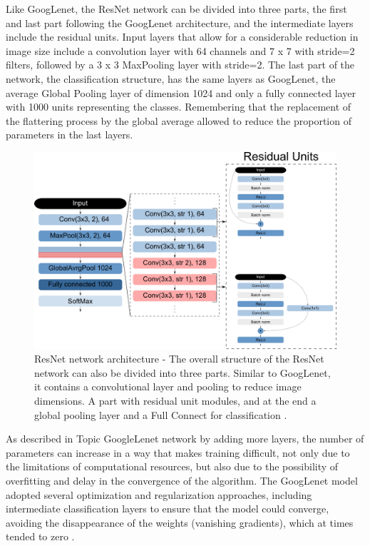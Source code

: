 Like GoogLenet, the ResNet network can be divided into three parts, the first and last part following the GoogLenet architecture, and the intermediate layers include the residual units. Input layers that allow for a considerable reduction in image size include a convolution layer with 64 channels and 7 x 7 with stride=2 filters, followed by a 3 x 3 MaxPooling layer with stride=2. The last part of the network, the classification structure, has the same layers as GoogLenet, the average Global Pooling layer of dimension 1024 and only a fully connected layer with 1000 units representing the classes. Remembering that the replacement of the flattering process by the global average allowed to reduce the proportion of parameters in the last layers.

\begin{figure}
    \centering
    \includegraphics[scale=0.4]{"Part 3 - Learning Systems/Supervised Learning/Deep Learning/images/figure135.png"}
    \caption{ResNet network architecture - The overall structure of the ResNet network can also be divided into three parts. Similar to GoogLenet, it contains a convolutional layer and pooling to reduce image dimensions. A part with residual unit modules, and at the end a global pooling layer and a Full Connect for classification \cite{geron2019}.}
    \label{fig:figure135}
\end{figure}

As described in Topic GoogleLenet network by adding more layers, the number of parameters can increase in a way that makes training difficult, not only due to the limitations of computational resources, but also due to the possibility of overfitting and delay in the convergence of the algorithm. The GoogLenet model adopted several optimization and regularization approaches, including intermediate classification layers to ensure that the model could converge, avoiding the disappearance of the weights (vanishing gradients), which at times tended to zero \cite{geron2019}.

